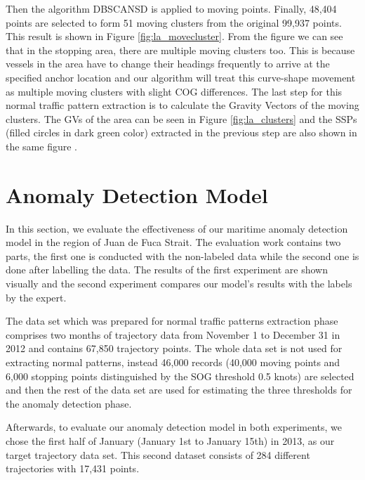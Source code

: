 \documentclass[12pt,glossary]{dalcsthesis}
\begin{document}
Then the algorithm DBSCANSD is applied to moving points. Finally, 48,404 points are selected to form 51 moving clusters from the original 99,937 points. This result is shown in Figure \ref{fig:la_movecluster}. From the figure we can see that in the stopping area, there are multiple moving clusters too. This is because vessels in the area have to change their headings frequently to arrive at the specified anchor location and our algorithm will treat this curve-shape movement as multiple moving clusters with slight COG differences. The last step for this normal traffic pattern extraction is to calculate the Gravity Vectors of the moving clusters. The GVs of the area can be seen in Figure \ref{fig:la_clusters} and the SSPs (filled circles in dark green color) extracted in the previous step are also shown in the same figure .


\section{Anomaly Detection Model}
\label{sec:exp_2}
In this section, we evaluate the effectiveness of our maritime anomaly detection model in the region of Juan de Fuca Strait. %
The evaluation work contains two parts, the first one is conducted with the non-labeled data while the second one is done after labelling the data. The results of the first experiment are shown visually and the second experiment compares our model's results with the labels by the expert.


The data set which was prepared for normal traffic patterns extraction phase comprises two months of trajectory data from November 1 to December 31 in 2012 and contains 67,850 trajectory points. The whole data set is not used for extracting normal patterns, instead 46,000 records (40,000 moving points and 6,000 stopping points distinguished by the SOG threshold 0.5 knots) are selected and then the rest of the data set are used for estimating the three thresholds for the anomaly detection phase. 

Afterwards, to evaluate our anomaly detection model in  both experiments, we chose the first half of January (January 1st to January 15th) in 2013, as our target trajectory data set. This second dataset consists of 284 different trajectories with 17,431 points. 
\end{document}
